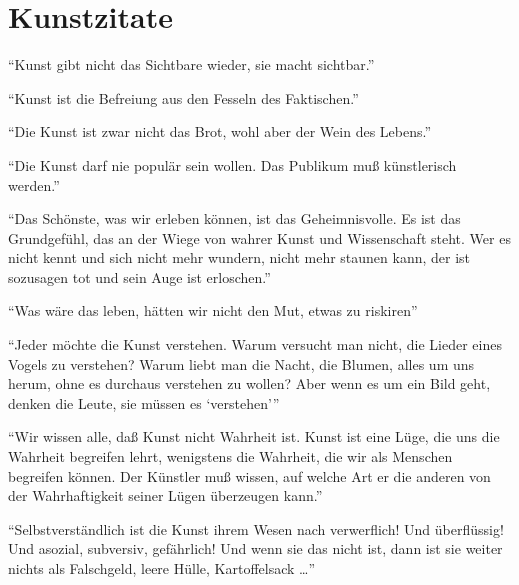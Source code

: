 \section{Kunstzitate}
\enquote{Kunst gibt nicht das Sichtbare wieder, sie macht sichtbar.}

\bigskip
\bigskip

\enquote{Kunst ist die Befreiung aus den Fesseln des Faktischen.}

\bigskip
\bigskip

\enquote{Die Kunst ist zwar nicht das Brot, wohl aber der Wein des Lebens.}

\bigskip
\bigskip

\enquote{Die Kunst darf nie populär sein wollen. Das Publikum muß künstlerisch werden.}

\bigskip
\bigskip

\enquote{Das Schönste, was wir erleben können, ist das Geheimnisvolle. Es ist das Grundgefühl, das an der Wiege von wahrer
Kunst und Wissenschaft steht. Wer es nicht kennt und sich nicht mehr wundern, nicht mehr staunen kann, der ist sozusagen
tot und sein Auge ist erloschen.}

\bigskip
\bigskip

\enquote{Was wäre das leben, hätten wir nicht den Mut, etwas zu riskiren}

\bigskip
\bigskip

\enquote{Jeder möchte die Kunst verstehen. Warum versucht man nicht, die Lieder eines Vogels zu verstehen? Warum liebt man
die Nacht, die Blumen, alles um uns herum, ohne es durchaus verstehen zu wollen? Aber wenn es um ein Bild geht, denken die
Leute, sie müssen es \enquote{verstehen}}

\bigskip
\bigskip

\enquote{Wir wissen alle, daß Kunst nicht Wahrheit ist. Kunst ist eine Lüge, die uns die Wahrheit begreifen lehrt,
wenigstens die Wahrheit, die wir als Menschen begreifen können. Der Künstler muß wissen, auf welche Art er die anderen von
der Wahrhaftigkeit seiner Lügen überzeugen kann.}

\bigskip
\bigskip

\enquote{Selbstverständlich ist die Kunst ihrem Wesen nach verwerflich! Und überflüssig! Und asozial, subversiv,
gefährlich! Und wenn sie das nicht ist, dann ist sie weiter nichts als Falschgeld, leere Hülle, Kartoffelsack \dots}
